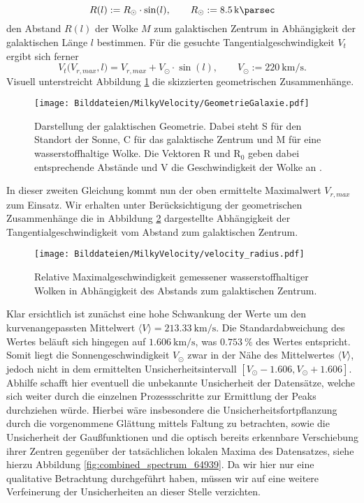 \documentclass[../../main.tex]{subfiles}
\begin{document}
    \[
        R(l) := R_{\odot}\cdot\sin(l), \qquad R_{\odot} := \SI{8.5}{\kilo\parsec}
    \]
    den Abstand $R(l)$ der Wolke $M$ zum galaktischen Zentrum in Abhängigkeit der galaktischen Länge $l$ bestimmen. 
    Für die gesuchte Tangentialgeschwindigkeit $V_t$ ergibt sich ferner
    \[
        V_t\bigl(V_{r,max},l\bigr) = V_{r,max} + V_{\odot}\cdot\sin(l), \qquad V_{\odot} := \SI{220}{\kilo\meter\per\second}.
    \] 
    Visuell unterstreicht Abbildung \ref{fig:GeometrieGalaxie} die skizzierten geometrischen Zusammenhänge.
    \begin{figure}[H]
        \centering
        \texttt{[image: Bilddateien/MilkyVelocity/GeometrieGalaxie.pdf]}
        \caption{Darstellung der galaktischen Geometrie. Dabei steht S für den Standort der Sonne, C für das galaktische Zentrum und M für eine wasserstoffhaltige Wolke. Die Vektoren R und $\text{R}_0$ geben dabei entsprechende Abstände und V die Geschwindigkeit der Wolke an \cite[p.9]{doc:SALSAStudentManual}.}
        \label{fig:GeometrieGalaxie}
    \end{figure}
    In dieser zweiten Gleichung kommt nun der oben ermittelte Maximalwert $V_{r,max}$ zum Einsatz. Wir erhalten unter Berücksichtigung der geometrischen Zusammenhänge die in Abbildung \ref{fig:velocity_radius} dargestellte Abhängigkeit der Tangentialgeschwindigkeit vom Abstand zum galaktischen Zentrum.
    \begin{figure}[H]
        \centering
        \texttt{[image: Bilddateien/MilkyVelocity/velocity\_radius.pdf]}
        \caption{Relative Maximalgeschwindigkeit gemessener wasserstoffhaltiger Wolken in Abhängigkeit des Abstands zum galaktischen Zentrum.}
        \label{fig:velocity_radius}
    \end{figure}
    Klar ersichtlich ist zunächst eine hohe Schwankung der Werte um den kurvenangepassten Mittelwert $\langle V\rangle = \SI{213.33}{\km\per\s}$. Die Standardabweichung des Wertes beläuft sich hingegen auf $\SI{1.606}{\km\per\s}$, was $\SI{0.753}{\percent}$ des Wertes entspricht. Somit liegt die Sonnengeschwindigkeit $V_{\odot}$ zwar in der Nähe des Mittelwertes $\langle V\rangle$, jedoch nicht in dem ermittelten Unsicherheitsintervall $[V_\odot - 1.606,V_\odot + 1.606]$. Abhilfe schafft hier eventuell die unbekannte Unsicherheit der Datensätze, welche sich weiter durch die einzelnen Prozessschritte zur Ermittlung der Peaks durchziehen würde. Hierbei wäre insbesondere die Unsicherheitsfortpflanzung durch die vorgenommene Glättung mittels Faltung zu betrachten, sowie die Unsicherheit der Gaußfunktionen und die optisch bereits erkennbare Verschiebung ihrer Zentren gegenüber der tatsächlichen lokalen Maxima des Datensatzes, siehe hierzu Abbildung \ref{fig:combined_spectrum_64939}. Da wir hier nur eine qualitative Betrachtung durchgeführt haben, müssen wir auf eine weitere Verfeinerung der Unsicherheiten an dieser Stelle verzichten. 
\end{document}
